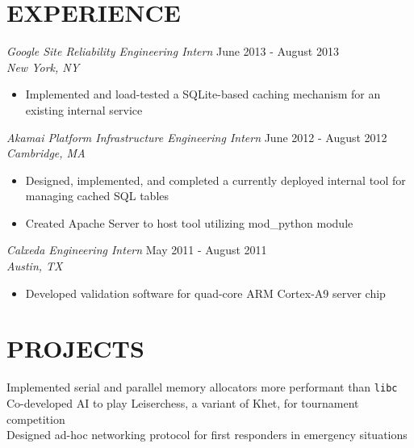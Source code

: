 \documentclass[margin]{res}
\begin{document}
\begin{resume}
\section{EXPERIENCE} 
                    {\sl Google Site Reliability Engineering Intern} 
                    \hfill June 2013 - August 2013 \\
                    {\sl  New York, NY}
                    \begin{itemize} \itemsep -2pt %
                         \item Implemented and load-tested a SQLite-based
                           caching mechanism for an existing internal service
                    \end{itemize}

                    {\sl Akamai Platform Infrastructure Engineering Intern} 
                    \hfill June 2012 - August 2012 \\
                    {\sl Cambridge, MA}
                    \begin{itemize} \itemsep -2pt %
                         \item Designed, implemented, and completed a 
                           currently deployed internal tool for managing cached 
                           SQL tables
                         \item Created Apache Server to host tool utilizing 
                           mod\_python module 
                    \end{itemize}

                    {\sl Calxeda Engineering Intern} 
                    \hfill May 2011 - August 2011 \\
                    {\sl Austin, TX}
                    \begin{itemize} \itemsep -2pt %
                          \item Developed validation software for quad-core ARM 
                            Cortex-A9 server chip
                    \end{itemize}

\section{PROJECTS}  Implemented serial and parallel memory allocators more
                      performant than \texttt{libc} \\
                    Co-developed AI to play Leiserchess, a variant of Khet, for 
                      tournament competition \\
                    Designed ad-hoc networking protocol for first responders in
                      emergency situations
 

\end{resume}
\end{document}
